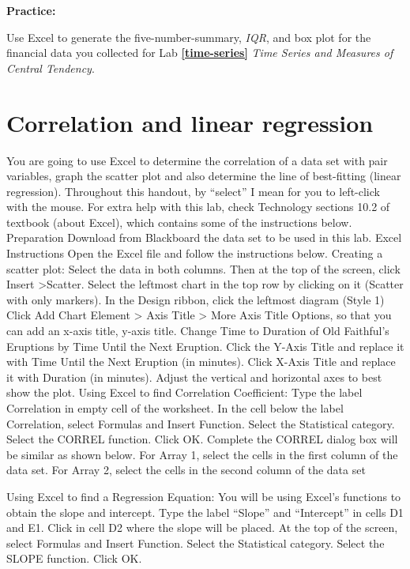 \documentclass[
]{book}
\begin{document}
\textbf{Practice:}

Use Excel to generate the five-number-summary, \emph{IQR}, and box plot for the financial data you collected for Lab \textbf{\ref{time-series}} \emph{Time Series and Measures of Central Tendency}.

\hypertarget{correlation-and-linear-regression}{%
\chapter{Correlation and linear regression}\label{correlation-and-linear-regression}}

You are going to use Excel to determine the correlation of a data set with pair variables, graph the scatter plot and also determine the line of best-fitting (linear regression).
Throughout this handout, by ``select'' I mean for you to left-click with the mouse.
For extra help with this lab, check Technology sections 10.2 of textbook (about Excel), which contains some of the instructions below.
Preparation
Download from Blackboard the data set to be used in this lab.
Excel Instructions
Open the Excel file and follow the instructions below.
Creating a scatter plot:
Select the data in both columns. Then at the top of the screen, click Insert \textgreater Scatter.
Select the leftmost chart in the top row by clicking on it (Scatter with only markers).
In the Design ribbon, click the leftmost diagram (Style 1)
Click Add Chart Element \textgreater{} Axis Title \textgreater{} More Axis Title Options, so that you can add an x-axis title, y-axis title.
Change Time to Duration of Old Faithful's Eruptions by Time Until the Next Eruption.
Click the Y-Axis Title and replace it with Time Until the Next Eruption (in minutes).
Click X-Axis Title and replace it with Duration (in minutes).
Adjust the vertical and horizontal axes to best show the plot.
Using Excel to find Correlation Coefficient:
Type the label Correlation in empty cell of the worksheet.
In the cell below the label Correlation, select Formulas and Insert Function.
Select the Statistical category. Select the CORREL function. Click OK.
Complete the CORREL dialog box will be similar as shown below.
For Array 1, select the cells in the first column of the data set.
For Array 2, select the cells in the second column of the data set

Using Excel to find a Regression Equation:
You will be using Excel's functions to obtain the slope and intercept. Type the label ``Slope'' and ``Intercept'' in cells D1 and E1.
Click in cell D2 where the slope will be placed.
At the top of the screen, select Formulas and Insert Function.
Select the Statistical category. Select the SLOPE function. Click OK.
\end{document}

